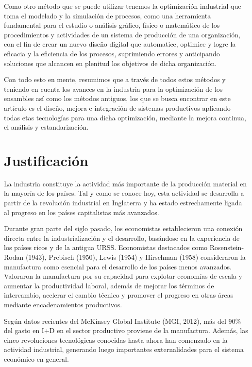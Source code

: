     
    Como otro método que se puede utilizar tenemos la optimización industrial que toma el modelado y la simulación de procesos, como una herramienta fundamental para el estudio o análisis gráfico, físico o matemático de los procedimientos y actividades de un sistema de producción de una organización, con el fin de crear un nuevo diseño digital que automatice, optimice y logre la eficacia y la eficiencia de los procesos, suprimiendo errores y anticipando soluciones que alcancen en plenitud los objetivos de dicha organización. \cite{sanchez2015analisis}
    
    Con todo esto en mente, resumimos que a través de todos estos métodos y teniendo en cuenta los avances en la industria para la optimización de los ensambles así como los métodos antiguos, los que se busca encontrar en este artículo es el diseño, mejora e integración de sistemas productivos aplicando todas etas tecnologías para una dicha optimización, mediante la mejora continua, el análisis y estandarización.
    
    
    \section{Justificación}
    
    La industria constituye la actividad más importante de la producción material en la mayoría de los países. Tal y como se conoce hoy, esta actividad se desarrolla a partir de la revolución industrial en Inglaterra y ha estado estrechamente ligada al progreso en los países capitalistas más avanzados.
    
    Durante gran parte del siglo pasado, los economistas establecieron una conexión directa entre la industrialización y el desarrollo, basándose en la experiencia de los países ricos y de la antigua URSS. Economistas destacados como Rosenstein-Rodan (1943), Prebisch (1950), Lewis (1954) y Hirschman (1958) consideraron la manufactura como esencial para el desarrollo de los países menos avanzados. Valoraron la manufactura por su capacidad para explotar economías de escala y aumentar la productividad laboral, además de mejorar los términos de intercambio, acelerar el cambio técnico y promover el progreso en otras áreas mediante encadenamientos productivos.
    
    Según datos recientes del McKinsey Global Institute (MGI, 2012), más del 90\% del gasto en I+D en el sector productivo proviene de la manufactura. Además, las cinco revoluciones tecnológicas conocidas hasta ahora han comenzado en la actividad industrial, generando luego importantes externalidades para el sistema económico en general.
    
